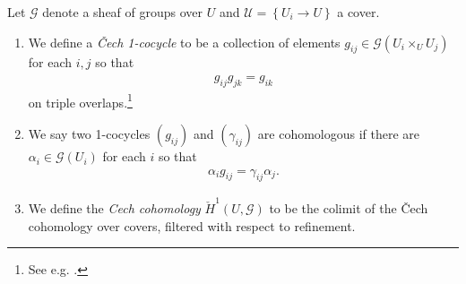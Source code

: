 \documentclass[11pt,openany]{book}
\begin{document}
\begin{definition}\label{def:cech-cover-cohomology} 
Let $\mathcal{G}$ denote a sheaf of groups over $U$ and $\mathcal{U} = \left\{ U_i \to U \right\}$ a cover.
\begin{enumerate}
    \item We define a \textit{\v{C}ech 1-cocycle} to be a collection of elements $g_{ij} \in \mathcal{G}(U_i \times_U U_j)$ for each $i,j$ so that
\begin{align*}
    g_{ij}g_{jk} = g_{ik}
\end{align*}
on triple overlaps.\footnote{See e.g. \cite[\S11]{MilneLEC}.}
    \item We say two 1-cocycles $(g_{ij})$ and $(\gamma_{ij})$ are cohomologous if there are $\alpha_i \in \mathcal{G}(U_i)$ for each $i$ so that
    \begin{align*}
        \alpha_i g_{ij} = \gamma_{ij} \alpha_j.
    \end{align*}
    \item We define the \textit{Cech cohomology} $\check{H}^1(U,\mathcal{G})$ to be the colimit of the \v{C}ech cohomology over covers, filtered with respect to refinement.
\end{enumerate}
\end{definition}
\end{document}
